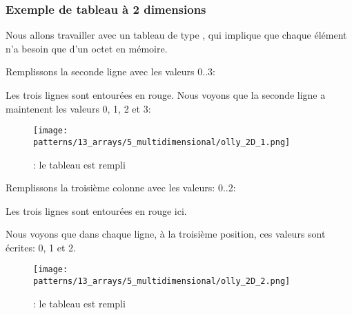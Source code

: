 \subsubsection{Exemple de tableau à 2 dimensions}

Nous allons travailler avec un tableau de type \Tchar, qui implique que chaque élément
n'a besoin que d'un octet en mémoire.

\myindex{\olly}

Remplissons la seconde ligne avec les valeurs 0..3:



Les trois lignes sont entourées en rouge.
Nous voyons que la seconde ligne a maintenent les valeurs 0, 1, 2 et 3:

\begin{figure}[H]
\centering
\texttt{[image: patterns/13\_arrays/5\_multidimensional/olly\_2D\_1.png]}
\caption{\olly: le tableau est rempli}
\end{figure}

\myindex{\olly}

Remplissons la troisième colonne avec les valeurs: 0..2:



Les trois lignes sont entourées en rouge ici.

Nous voyons que dans chaque ligne, à la troisième position, ces valeurs sont écrites:
0, 1 et 2.

\begin{figure}[H]
\centering
\texttt{[image: patterns/13\_arrays/5\_multidimensional/olly\_2D\_2.png]}
\caption{\olly: le tableau est rempli}
\end{figure}

